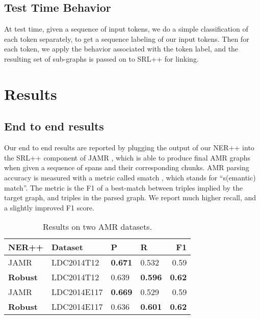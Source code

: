 \documentclass[11pt]{article}
\begin{document}
\subsection{Test Time Behavior}

At test time, given a sequence of input tokens, we do a simple classification of each token separately, to get a sequence labeling of our input tokens. Then for each token, we apply the behavior associated with the token label, and the resulting set of sub-graphs is passed on to SRL++ for linking.

% 

\section{Results}

\subsection{End to end results}

Our end to end results are reported by plugging the output of our NER++ into the SRL++ component of JAMR \cite{2014flanigan-amr}, which is able to produce final AMR graphs when given a sequence of spans and their corresponding chunks. AMR parsing accuracy is measured with a metric called smatch \needcite, which stands for ``s(emantic) match''. The metric is the F1 of a best-match between triples implied by the target graph, and triples in the parsed graph. We report much higher recall, and a slightly improved F1 score.

\begin{table}[h]
\begin{center}
\begin{tabular}{|l|l|l|l|r|}
\hline NER++ & Dataset & P & R & \bf F1 \\ \hline
JAMR & LDC2014T12 & \textbf{0.671} & 0.532 & 0.59 \\
\textbf{Robust} & LDC2014T12 & 0.639 & \textbf{0.596} & \textbf{0.62} \\
JAMR & LDC2014E117 & \textbf{0.669} & 0.529 & 0.59 \\
\bf Robust & LDC2014E117 & 0.636 & \textbf{0.601} & \textbf{0.62} \\
\hline
\end{tabular}
\end{center}
\caption{\label{font-table} Results on two AMR datasets. }
\end{table}
\end{document}
